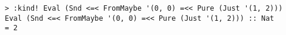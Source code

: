 \begin{repl}\begin{lstlisting}
> :kind! Eval (Snd <=< FromMaybe '(0, 0) =<< Pure (Just '(1, 2)))
Eval (Snd <=< FromMaybe '(0, 0) =<< Pure (Just '(1, 2))) :: Nat
= 2\end{lstlisting}\end{repl}
